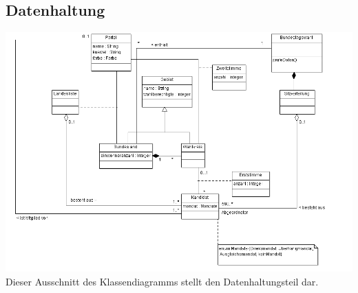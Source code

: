 \documentclass[10pt,a4paper]{article}
\begin{document}
\subsection{Datenhaltung}
\includegraphics[scale=0.5]{Datenhaltung-Ausschnitt} \\
Dieser Ausschnitt des Klassendiagramms stellt den Datenhaltungsteil dar.
\end{document}

